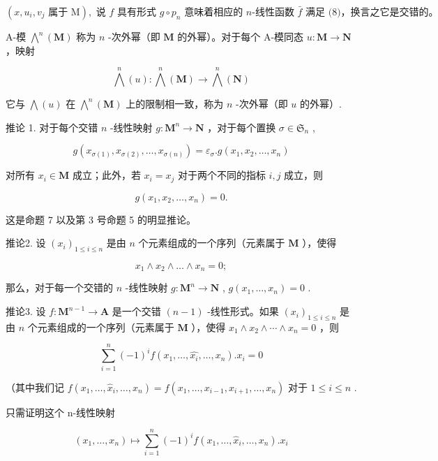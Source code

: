 \((x, u_{i}, v_{j} \text{ 属于 M}), \text{ 说 } f \text{ 具有形式 } g \circ p_{n} \text{ 意味着相应的 } n\text{-线性函数 } \bar{f} \text{ 满足 (8)，换言之它是交错的。}\)

A-模 \(\bigwedge^{n}(\mathbf{M})\) 称为 \(n\) -次外幂（即 \(\mathbf{M}\) 的外幂）。对于每个 A-模同态 \(u: \mathbf{M} \to \mathbf{N}\) ，映射

\[
\bigwedge^ {n} (u): \bigwedge^ {n} (\mathbf {M}) \rightarrow \bigwedge^ {n} (\mathbf {N})
\]

它与 \(\bigwedge(u)\) 在 \(\bigwedge^{n}(\mathbf{M})\) 上的限制相一致，称为 \(n\) -次外幂（即 \(u\) 的外幂）.

推论 1. 对于每个交错 \(n\) -线性映射 \(g: \mathbf{M}^n \to \mathbf{N}\) ，对于每个置换 \(\sigma \in \mathfrak{S}_n\) ,

\[
g \left(x _ {\sigma (1)}, x _ {\sigma (2)}, \dots , x _ {\sigma (n)}\right) = \varepsilon_ {\sigma}. g \left(x _ {1}, x _ {2}, \dots , x _ {n}\right)\tag{10}
\]

对所有 \(x_{i} \in \mathbf{M}\) 成立；此外，若 \(x_{i} = x_{j}\) 对于两个不同的指标 \(i, j\) 成立，则

\[
g (x _ {1}, x _ {2}, \dots , x _ {n}) = 0.
\]

这是命题 7 以及第 3 号命题 5 的明显推论。

推论2. 设 \((x_{i})_{1\leqslant i\leqslant n}\) 是由 \(n\) 个元素组成的一个序列（元素属于 \(\mathbf{M}\) ），使得

\[
x _ {1} \wedge x _ {2} \wedge \dots \wedge x _ {n} = 0;
\]

那么，对于每一个交错的 \(n\) -线性映射 \(g: \mathbf{M}^n \to \mathbf{N}\) , \(g(x_1, \ldots, x_n) = 0\) .

推论3. 设 \(f: \mathbf{M}^{n-1} \to \mathbf{A}\) 是一个交错 \((n-1)\) -线性形式。如果 \((x_i)_{1 \leq i \leq n}\) 是由 \(n\) 个元素组成的一个序列（元素属于 \(\mathbf{M}\) ），使得 \(x_1 \wedge x_2 \wedge \cdots \wedge x_n = 0\) ，则

\[
\sum_ {i = 1} ^ {n} (- 1) ^ {i} f (x _ {1}, \dots , \hat {x _ {i}}, \dots , x _ {n}). x _ {i} = 0\tag{11}
\]

（其中我们记 \(f(x_{1},\ldots ,\hat{x}_{i},\ldots ,x_{n}) = f(x_{1},\ldots ,x_{i - 1},x_{i + 1},\ldots ,x_{n})\) 对于 \(1\leqslant i\leqslant n\) .

只需证明这个 n-线性映射

\[
(x _ {1}, \dots , x _ {n}) \mapsto \sum_ {i = 1} ^ {n} (- 1) ^ {i} f (x _ {1}, \dots , \hat {x} _ {i}, \dots , x _ {n}). x _ {i}
\]

